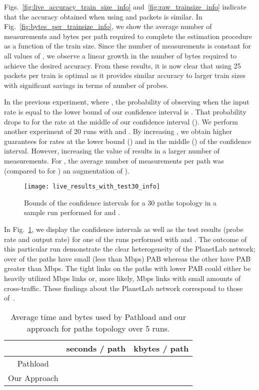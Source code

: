 \documentclass[final,5p,times,twocolumn]{elsarticle}
\begin{document}
Figs.~\ref{fig:live_accuracy_train_size_info} and~\ref{fig:raw_trainsize_info} indicate that the accuracy obtained when using  and  packets is similar.  
In Fig.~\ref{fig:bytes_per_trainsize_info}, we show the average number of measurements and bytes per path required to complete the estimation procedure as a function of the train size.  Since the number of measurements is constant for all values of , we observe a linear growth in the number of bytes required to achieve the desired accuracy.  From these results, it is now clear that using 25 packets per train is optimal as it provides similar accuracy to larger train sizes with significant savings in terms of number of probes.



In the previous experiment, where , the probability of observing  when the input rate is equal to the lower bound of our confidence interval is .  That probability drops to  for the rate at the middle of our confidence interval ().  We perform another experiment of 20 runs with  and .  By increasing , we obtain higher guarantees for rates at the lower bound () and in the middle () of the confidence interval.
However, increasing the value of  results in a larger number of measurements.  
For , the average number of measurements per path was  (compared to  for ) an augmentation of ).  


\begin{figure}[!h]
	\centering
\texttt{[image: live\_results\_with\_test30\_info]}
	\caption{Bounds of the confidence intervals for a 30 paths topology in a sample run performed for  and .	\label{fig:pl_exp_info}}
\end{figure}

In Fig.~\ref{fig:pl_exp_info}, we display the confidence intervals as well as the test results (probe rate and output rate) for one of the runs performed with  and .  The outcome of this particular run demonstrate the clear heterogeneity of the PlanetLab network; over  of the paths have small (less than  Mbps) PAB whereas the other  have PAB greater than  Mbps.  The tight links on the paths with lower PAB could either be heavily utilized  Mbps links or, more likely,  Mbps links with small amounts of cross-traffic.  These findings about the PlanetLab network correspond to those of~\citet{lee:05}.



\begin{table}[!h]
	\caption{Average time and bytes used by Pathload and our approach for  paths topology over 5 runs.\label{tab:pathload_info}}
	\centering
	\begin{tabular}{c|cc}
		& seconds / path & kbytes / path \\
		\hline
		Pathload &  & \\
		Our Approach &  & 
	\end{tabular}
\end{table}
\end{document}
